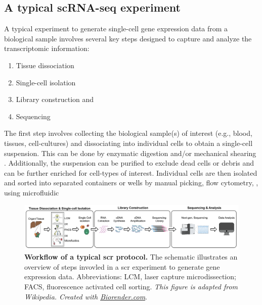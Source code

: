 \subsection{A typical scRNA-seq experiment}
\label{sec:scrna_typical}
\par A typical experiment to generate single-cell gene expression data from a biological sample involves several key steps designed to capture and analyze the transcriptomic information: 
\begin{enumerate}
\item Tissue dissociation
\item Single-cell isolation
\item Library construction and 
\item Sequencing 
\end{enumerate}

The first step involves collecting the biological sample(s) of interest (e.g., blood, tissues, cell-cultures) and dissociating into individual cells to obtain a single-cell suspension. This can be done by enzymatic digestion and/or mechanical shearing \textbf{\cite{vieira_braga_tissue_2019}}. Additionally, the suspension can be purified to exclude dead cells or debris and can be further enriched for cell-types of interest. Individual cells are then isolated and sorted into separated containers or wells by manual picking, \textbf{\cite{tang_mrna-seq_2009,kalisky_brief_2018,guo_resolution_2010}}
flow cytometry, \textbf{\cite{hayashi_single-cell_2010,jaitin_massively_2014}}, 
using microfluidic 
\begin{figure}[H]
    \centering
    \includegraphics[width=\linewidth]{Chapter1/Fig/F1-5-01.png}
    \caption[A typical \gls{scr} experiment]{\textbf{Workflow of a typical \gls{scr} protocol.} The schematic illustrates an overview of steps invovled in a \gls{scr} experiment to generate gene expression data. Abbreviations: LCM, laser capture microdissection; FACS, fluorescence activated cell sorting. \textit{This figure is adapted from Wikipedia. Created with \href{https://www.biorender.com/}{Biorender.com}}.}
    \label{fig:chp1_scrna-2}
\end{figure}

